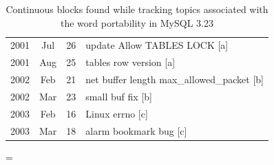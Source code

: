 \documentclass[titlepage,usenames,a4,landscape,semhelv]{seminar}
\begin{document}
\begin{slide}
\newslide

\begin{table}
\centering
\begin{tabular}{|ccc|l|}

\hline
2001 &  Jul &  26 &    update Allow TABLES LOCK [a] \\ 

2001 &  Aug &  25 &    tables row version [a] \\
\hline
\hline
2002 &  Feb &  21 &    net buffer length  max\_allowed\_packet [b] \\
2002 &  Mar &  23 &    small buf fix [b]  \\
\hline
\hline
2003 &  Feb &  16 &    Linux errno  [c] \\
2003 &  Mar &  18 &    alarm bookmark bug [c] \\
\hline
\end{tabular}
\caption{Continuous blocks found while tracking topics associated with the word portability in MySQL 3.23}
\label{tab:portability}
\end{table}

\newslide



=
\end{slide}
\end{document}

